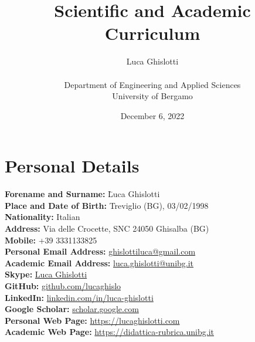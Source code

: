 \documentclass[11pt]{article}
\title{\huge Scientific and Academic Curriculum%
}
\author{\vspace{0.2cm}\begin{huge}Luca Ghislotti\end{huge}\\\vspace{0.1cm} Department of Engineering and Applied Sciences\\University of Bergamo}
\date{December 6, 2022}
\begin{document}
\maketitle
\thispagestyle{fancy}

\onehalfspacing

\section*{Personal Details}
\begin{tabbing}
\hspace{8pt}\textbf{Forename and Surname: } \= Luca Ghislotti\\
\hspace{6pt}\textbf{Place and Date of Birth: } \> Treviglio (BG), 03/02/1998\\
\hspace{76.5pt}\textbf{Nationality: } \>Italian\\
\hspace{94pt}\textbf{Address: } Via delle Crocette, SNC 24050 Ghisalba (BG)\\
\hspace{100.5pt}\textbf{Mobile: } +39 3331133825\\
\hspace{6.5pt}\textbf{Personal Email Address: } \href{mailto:ghislottiluca@gmail.com}{ghislottiluca@gmail.com}\\
\hspace{0pt}\textbf{Academic Email Address: } \href{mailto:l.ghislotti@studenti.unibg.it}{luca.ghislotti@unibg.it}\\
\hspace{105pt}\textbf{Skype: } \href{https://join.skype.com/invite/m1XvXqe82tbO}{Luca Ghislotti}\\
\hspace{96.5pt}\textbf{GitHub: } \href{https://github.com/lucaghislo}{github.com/lucaghislo}\\
\hspace{89.5pt}\textbf{LinkedIn: } \href{https://www.linkedin.com/in/luca-ghislotti/}{linkedin.com/in/luca-ghislotti}\\
\hspace{55.5pt}\textbf{Google Scholar: } \href{https://scholar.google.com/citations?user=Xt1\_bCYAAAAJ}{scholar.google.com}\\
\hspace{31.5pt}\textbf{Personal Web Page: } \href{https://lucaghislotti.com}{https://lucaghislotti.com}\\
\hspace{25pt}\textbf{Academic Web Page: } \href{https://didattica-rubrica.unibg.it/ugov/person/135728}{https://didattica-rubrica.unibg.it} 
\end{tabbing}
\end{document}
